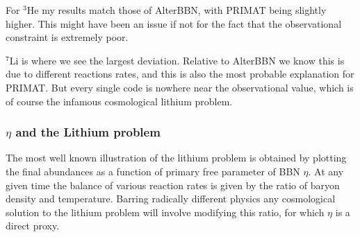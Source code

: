 For $^{3}$He my results match those of AlterBBN, with PRIMAT being slightly higher. This might have been an issue if not for the fact that the observational constraint is extremely poor. 

${}^7\text{Li}$ is where we see the largest deviation. Relative to AlterBBN we know this is due to different reactions rates, and this is also the most probable explanation for PRIMAT. But every single code is nowhere near the observational value, which is of course the infamous cosmological lithium problem.


\subsubsection{$\eta$ and the Lithium problem}
The most well known illustration of the lithium problem is obtained by plotting the final abundances as a function of primary free parameter of BBN $\eta$. At any given time the balance of various reaction rates is given by the ratio of baryon density and temperature. Barring radically different physics any cosmological solution to the lithium problem will involve modifying this ratio, for which $\eta$ is a direct proxy. 



